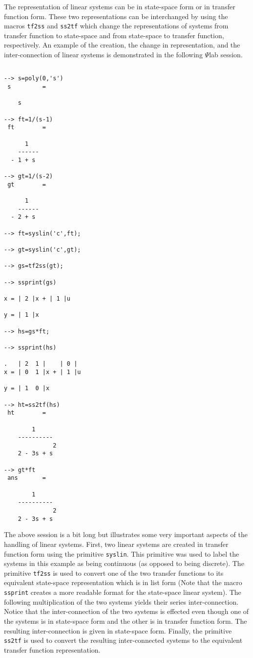 	The representation of linear systems can be in state-space
form or in transfer function form.  These two representations can
be interchanged by using the macros 
{\tt tf2ss} and 
{\tt ss2tf}
which change the representations of systems from transfer function
to state-space and from state-space to transfer function, respectively.
An example of the creation, the change in representation, and the
inter-connection of linear systems is demonstrated in the following
$\Psi$lab session.
\begin{verbatim}
 
--> s=poly(0,'s')
 s         =
 
    s   
 
--> ft=1/(s-1)
 ft        =
 
      1     
    ------  
  - 1 + s   
 
--> gt=1/(s-2)
 gt        =
 
      1     
    ------  
  - 2 + s   
 
--> ft=syslin('c',ft);
 
--> gt=syslin('c',gt);
 
--> gs=tf2ss(gt);

--> ssprint(gs)
 
x = | 2 |x + | 1 |u   
 
y = | 1 |x   
 
--> hs=gs*ft;
 
--> ssprint(hs)
 
.   | 2  1 |    | 0 |    
x = | 0  1 |x + | 1 |u   
 
y = | 1  0 |x   
 
--> ht=ss2tf(hs)
 ht        =
 
        1        
    ----------   
              2  
    2 - 3s + s   
 
--> gt*ft
 ans       =
 
        1        
    ----------   
              2  
    2 - 3s + s   

\end{verbatim}
The above session is a bit long but illustrates some very important
aspects of the handling of linear systems.  First, two linear systems
are created in transfer function form using the primitive 
{\tt syslin}.
This primitive was used to label the systems in this example 
as being continuous (as opposed to
being discrete).  The primitive {\tt tf2ss} is used to convert one of the
two transfer functions to its equivalent state-space representation
which is in list form (Note that the macro {\tt ssprint} creates a more
readable format for the state-space linear system).
The following multiplication of the two systems yields their
series inter-connection.  Notice that the inter-connection 
of the two systems is effected even though one of the systems is
in state-space form and the other is in transfer function form.
The resulting inter-connection is given in state-space form.
Finally, the primitive {\tt ss2tf} is used to convert the resulting
inter-connected systems to the equivalent transfer function representation.

